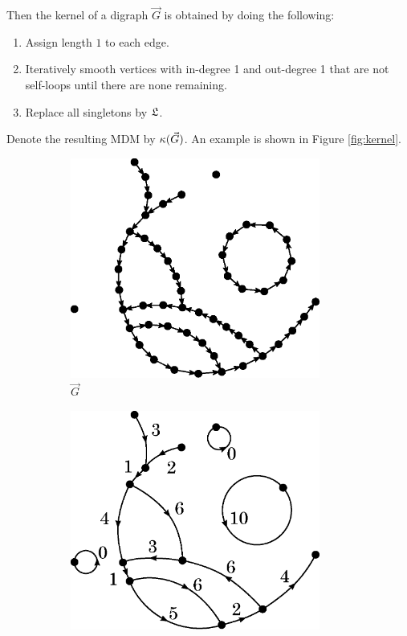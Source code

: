 Then the kernel of a digraph $\vec{G}$ is obtained by doing the following:
\begin{enumerate}
    \item Assign length $1$ to each edge.
    \item Iteratively smooth vertices with in-degree 1 and out-degree 1 that are not self-loops until there are none remaining.
    \item Replace all singletons by $\mathfrak L$.
\end{enumerate}
Denote the resulting MDM by $\kappa(\vec{G})$. An example is shown in Figure \ref{fig:kernel}.
\begin{figure}[htbp]
    \centering
    \begin{subfigure}[htbp]{0.45\textwidth}
        \centering
        \includegraphics[width=0.90\textwidth]{Content/Pictures/kernel1.eps}
        \caption{$\vec{G}$}
    \end{subfigure}
    \hfill
    \begin{subfigure}[htbp]{0.45\textwidth}
        \centering
        \includegraphics[width=0.90\textwidth]{Content/Pictures/kernel2.eps}

\end{subfigure}
\end{figure}
